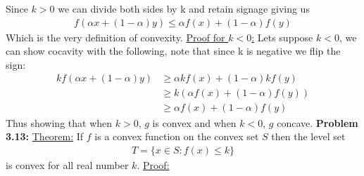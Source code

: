 \documentclass{article}
\begin{document}
Since $k > 0$ we can divide both sides by k and retain signage giving us
\begin{align*} 
    f(\alpha x + (1 - \alpha)y) \leq \alpha f(x) + (1 - \alpha)f(y)
\end{align*}
Which is the very definition of convexity. \newline
\underline{Proof for $k < 0$:} Lets suppose $k < 0$, we can show cocavity with the following, note that since k is negative we flip the sign:
\begin{align*}
    kf(\alpha x + (1 - \alpha)y) & \geq \alpha kf(x) + (1 - \alpha)kf(y) \\
    & \geq k(\alpha f(x) + (1 - \alpha)f(y)) \\
    & \geq \alpha f(x) + (1 - \alpha)f(y)
\end{align*}
Thus showing that when $k > 0$, $g$ is convex and when $k < 0$, $g$ concave.
\break
\break
\textbf{Problem 3.13:} \underline{Theorem:} If $f$ is a convex function on the convex set $S$ then the level set
\begin{align*}
    T = \{ x \in S : f(x) \leq k \}
\end{align*}
is convex for all real number $k$. \newline
\underline{Proof:}
\end{document}
